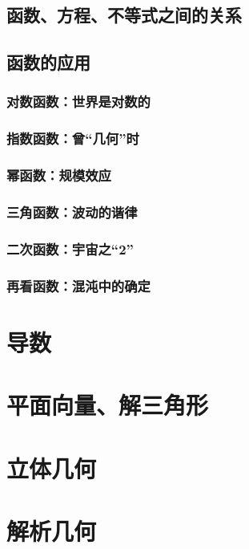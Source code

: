\documentclass[a4paper,openany]{ctexbook}
\begin{document}
\section{函数、方程、不等式之间的关系}

\section{函数的应用}

\subsection{对数函数：世界是对数的}

\subsection{指数函数：曾“几何”时}

\subsection{幂函数：规模效应}

\subsection{三角函数：波动的谐律}

\subsection{二次函数：宇宙之“2”}

\subsection{再看函数：混沌中的确定}

\chapter{导数}

\chapter{平面向量、解三角形}

\chapter{立体几何}

\chapter{解析几何}
\end{document}
